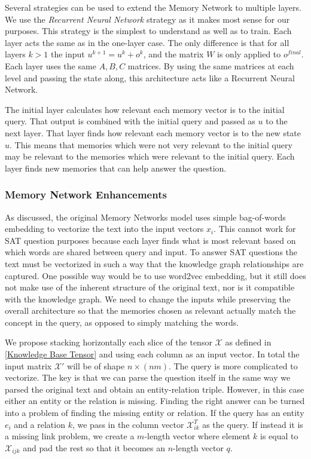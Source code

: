 \documentclass[pageno]{jpaper}
\begin{document}
Several strategies can be used to extend the Memory Network to multiple layers.
We use the \textit{Recurrent Neural Network} strategy as it makes most sense
for our purposes. This strategy is the simplest to understand as well as to train.
Each layer acts the same as in the one-layer case. The only difference is that
for all layers $k > 1$ the input $u^{k+1} = u^k + o^k$, and the matrix $W$
is only applied to $o^{final}$. Each layer uses the same $A,B,C$ matrices. By
using the same matrices at each level and passing the state along, this architecture
acts like a Recurrent Neural Network.

The initial layer calculates how relevant each memory vector is to the initial
query. That output is combined with the initial query and passed as $u$ to the
next layer. That layer finds how relevant each memory vector is to the new state
$u$. This means that memories which were not very relevant to the initial query
may be relevant to the memories which were relevant to the initial query. Each
layer finds new memories that can help answer the question. \\

\subsubsection{Memory Network Enhancements}
\label{Memory Network Enhancements}

As discussed, the original Memory Networks model uses simple bag-of-words
embedding to vectorize the text into the input vectors ${x_i}$. This cannot work
for SAT question purposes because each layer finds what is most relevant based
on which words are shared between query and input. To answer SAT questions the
text must be vectorized in such a way that the knowledge graph relationships are
captured. One possible way would be to use word2vec embedding, but it still does
not make use of the inherent structure of the original text, nor is it
compatible with the knowledge graph. We need to change the inputs while preserving
the overall architecture so that the memories chosen as relevant actually match
the concept in the query, as opposed to simply matching the words.

We propose stacking horizontally each slice of the tensor $\mathcal{X}$ as
defined in \ref{Knowledge Base Tensor} and using each column as an input vector.
In total the input matrix $\mathcal{X}'$ will be of shape $n\times (nm)$. The
query is more complicated to vectorize. The key is that we can parse the
question itself in the same way we parsed the original text and obtain an
entity-relation triple. However, in this case either an entity or the relation
is missing. Finding the right answer can be turned into a problem of finding the
missing entity or relation. If the query has an entity $e_i$ and a relation $k$,
we pass in the column vector $\mathcal{X}_{ik}^T$ as the query. If instead it is
a missing link problem, we create a $m$-length vector where element $k$ is equal
to $\mathcal{X}_{ijk}$ and pad the rest so that it becomes an $n$-length vector
$q$.
\end{document}
